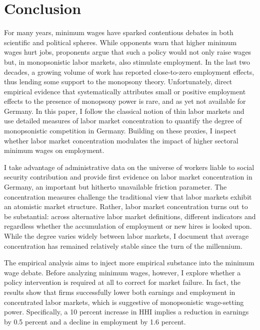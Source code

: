 \documentclass[11pt,oneside,reqno,xcolor=dvipsnames]{article} %
\begin{document}
\section{Conclusion}
\label{sec:9}

For many years, minimum wages have sparked contentious debates in both scientific and political spheres. While opponents warn that higher minimum wages hurt jobs, proponents argue that such a policy would not only raise wages but, in monopsonistic labor markets, also stimulate employment. In the last two decades, a growing volume of work has reported close-to-zero employment effects, thus lending some support to the monopsony theory. Unfortunately, direct empirical evidence that systematically attributes small or positive employment effects to the presence of monopsony power is rare, and as yet not available for Germany. In this paper, I follow the classical notion of thin labor markets and use detailed measures of labor market concentration to quantify the degree of monopsonistic competition in Germany. Building on these proxies, I inspect whether labor market concentration modulates the impact of higher sectoral minimum wages on employment.


I take advantage of administrative data on the universe of workers liable to social security contribution and provide first evidence on labor market concentration in Germany, an important but hitherto unavailable friction parameter. The concentration measures challenge the traditional view that labor markets exhibit an atomistic market structure. Rather, labor market concentration turns out to be substantial: across alternative labor market definitions, different indicators and regardless whether the accumulation of employment or new hires is looked upon. While the degree varies widely between labor markets, I document that average concentration has remained relatively stable since the turn of the millennium.

The empirical analysis aims to inject more empirical substance into the minimum wage debate. Before analyzing minimum wages, however, I explore whether a policy intervention is required at all to correct for market failure. In fact, the results show that firms successfully lower both earnings and employment in concentrated labor markets, which is suggestive of monopsonistic wage-setting power. Specifically, a 10 percent increase in HHI implies a reduction in earnings by 0.5 percent and a decline in employment by 1.6 percent.
\end{document}
